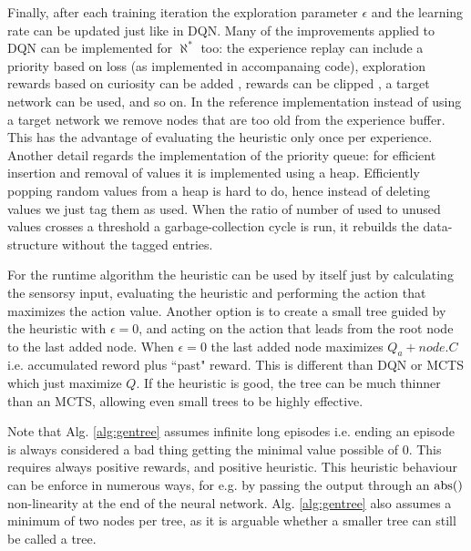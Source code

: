 \documentclass{article}
\newcommand{\alephstar}{$\aleph^*$ }
\begin{document}
Finally, after each training iteration the exploration parameter $\epsilon$ and the learning rate can be updated just like in DQN. Many of the improvements applied to DQN can be implemented for \alephstar too: the experience replay can include a priority based on loss \cite{schaul2015prioritized} (as implemented in accompanaing code), exploration rewards based on curiosity can be added \cite{burda2018exploration}, rewards can be clipped \cite{pohlen2018observe}, a target network can be used, and so on. In the reference implementation instead of using a target network we remove nodes that are too old from the experience buffer. This has the advantage of evaluating the heuristic only once per experience. Another detail regards the implementation of the priority queue: for efficient insertion and removal of values it is implemented using a heap. Efficiently popping random values from a heap is hard to do, hence instead of deleting values we just tag them as used. When the ratio of number of used to unused values crosses a threshold a garbage-collection cycle is run, it rebuilds the data-structure without the tagged entries.

For the runtime algorithm the heuristic can be used by itself just by calculating the sensorsy input, evaluating the heuristic and performing the action that maximizes the action value. Another option is to create a small tree guided by the heuristic with $\epsilon=0$, and acting on the action that leads from the root node to the last added node. When $\epsilon=0$ the last added node maximizes $Q_a + \mathit{node.C}$ i.e. accumulated reword plus ``past" reward. This is different than DQN or MCTS which just maximize $Q$. If the heuristic is good, the tree can be much thinner than an MCTS, allowing even small trees to be highly effective.

Note that Alg. \ref{alg:gentree} assumes infinite long episodes i.e. ending an episode is always considered a bad thing getting the minimal value possible of $0$. This requires always positive rewards, and positive heuristic. This heuristic behaviour can be enforce in numerous ways, for e.g. by passing the output through an $\rm abs()$ non-linearity at the end of the neural network. Alg. \ref{alg:gentree} also assumes a minimum of two nodes per tree, as it is arguable whether a smaller tree can still be called a tree.
\end{document}

